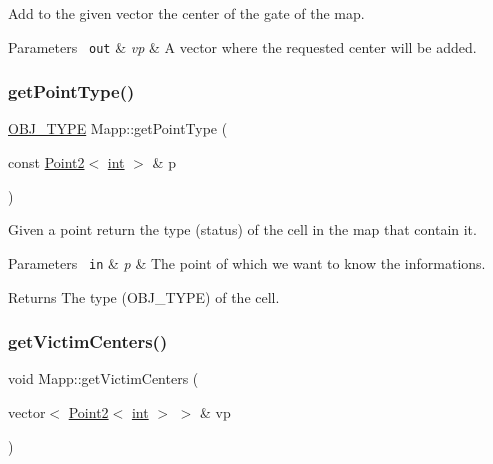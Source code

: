 Add to the given vector the center of the gate of the map. 


\begin{DoxyParams}[1]{Parameters}
\mbox{\texttt{ out}}  & {\em vp} & A vector where the requested center will be added. \\
\hline
\end{DoxyParams}
\mbox{\label{class_mapp_ac6341641bd67502eef7c025cb4cd1c71}} 
\subsubsection{\texorpdfstring{getPointType()}{getPointType()}}
{\footnotesize\ttfamily \mbox{\hyperlink{map_8hh_a714b9c2c276fbae637fee36453d9121e}{O\+B\+J\+\_\+\+T\+Y\+PE}} Mapp\+::get\+Point\+Type (\begin{DoxyParamCaption}\item[{const \mbox{\hyperlink{class_point2}{Point2}}$<$ \mbox{\hyperlink{draw_8hh_aa620a13339ac3a1177c86edc549fda9b}{int}} $>$ \&}]{p }\end{DoxyParamCaption})}



Given a point return the type (status) of the cell in the map that contain it. 


\begin{DoxyParams}[1]{Parameters}
\mbox{\texttt{ in}}  & {\em p} & The point of which we want to know the informations. \\
\hline
\end{DoxyParams}
\begin{DoxyReturn}{Returns}
The type (O\+B\+J\+\_\+\+T\+Y\+PE) of the cell. 
\end{DoxyReturn}
\mbox{\label{class_mapp_a3b3ad207536bfb80c9ea2fd254bfdd80}} 
\subsubsection{\texorpdfstring{getVictimCenters()}{getVictimCenters()}}
{\footnotesize\ttfamily void Mapp\+::get\+Victim\+Centers (\begin{DoxyParamCaption}\item[{vector$<$ \mbox{\hyperlink{class_point2}{Point2}}$<$ \mbox{\hyperlink{draw_8hh_aa620a13339ac3a1177c86edc549fda9b}{int}} $>$ $>$ \&}]{vp }\end{DoxyParamCaption})}



